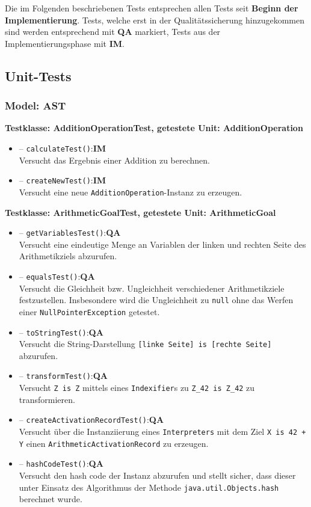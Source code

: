 \documentclass[parskip=full,11pt,twoside]{scrartcl}
\def\qa{\hfill\textbf{QA}}
\def\impl{\hfill\textbf{IM}}
\begin{document}
Die im Folgenden beschriebenen Tests entsprechen allen Tests seit \textbf{Beginn der Implementierung}. Tests, welche erst in der Qualitätssicherung hinzugekommen sind werden entsprechend mit \textbf{QA} markiert, Tests aus der Implementierungsphase mit \textbf{IM}.

\subsection{Unit-Tests}

\newenvironment{testClass}[1]{
    \newcommand{\test}[3]{
        \item[--] \texttt{##1}:##2\\##3
    }

    \textbf{Testklasse: #1Test, getestete Unit: #1}

    \begin{itemize}
}{
    \end{itemize}
}

\newcommand{\equalsTest}[2]{
    \test{equalsTest()}{#1}{
        Versucht die Gleichheit bzw. Ungleichheit verschiedener #2 festzustellen.
        Insbesondere wird die Ungleichheit zu \texttt{null} ohne das Werfen einer \texttt{Null\-Pointer\-Exception} getestet.
    }
}

\newcommand{\hashCodeTest}{
    \test{hashCodeTest()}{\qa}{
        Versucht den hash code der Instanz abzurufen und stellt sicher, dass dieser unter Einsatz des Algorithmus der Methode \texttt{java.util.Objects.hash} berechnet wurde.
    }
}

\subsubsection{Model: AST}

\begin{testClass}{AdditionOperation}
    \test{calculateTest()}{\impl}{
        Versucht das Ergebnis einer Addition zu berechnen.
    }
    \test{createNewTest()}{\impl}{
        Versucht eine neue \texttt{AdditionOperation}-Instanz zu erzeugen.
    }
\end{testClass}

\begin{testClass}{ArithmeticGoal}
    \test{getVariablesTest()}{\qa}{
        Versucht eine eindeutige Menge an Variablen der linken und rechten Seite des Arithmetikziels abzurufen.
    }
    \equalsTest{\qa}{Arithmetikziele}
    \test{toStringTest()}{\qa}{
        Versucht die String-Darstellung \texttt{[linke Seite] is [rechte Seite]} abzurufen.
    }
    \test{transformTest()}{\qa}{
        Versucht \texttt{Z is Z} mittels eines \texttt{Indexifier}s zu \texttt{Z\_42 is Z\_42} zu transformieren.
    }
    \test{createActivationRecordTest()}{\qa}{
        Versucht über die Instanziierung eines \texttt{Interpreters} mit dem Ziel \texttt{X is 42 + Y} einen \texttt{ArithmeticActivationRecord} zu erzeugen.
    }
    \hashCodeTest
\end{testClass}
\end{document}
